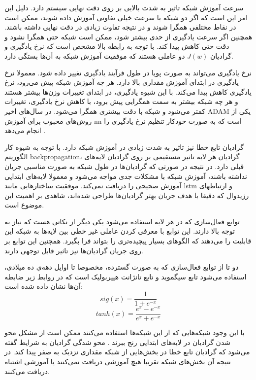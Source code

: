 سرعت آموزش شبکه تاثیر به شدت بالایی بر روی دقت نهایی سیستم دارد. دلیل این امر
این است که اگر دو شبکه با سرعت خیلی تفاوتی آموزش داده شوند، ممکن است در نقاط
مختلفی همگرا شوند و در نتیجه تفاوت زیادی در دقت نهایی داشته باشند. همچنین اگر
سرعت یادگیری از حدی بیشتر شود، ممکن است شبکه حتی همگرا نشود و دقت حتی کاهش پیدا
کند. با توجه به رابطه بالا مشخص است که نرخ یادگیری و گرادیان $J(w)$ دو عاملی
هستند که موفقیت آموزش شبکه به آن‌ها بستگی دارد.

نرخ یادگیری می‌تواند به صورت پویا در طول فرآیند یادگیری تغییر داده شود. معمولا
نرخ یادگیری در ابتدای آموزش مقداری بالا دارد. هر چه آموزش شبکه پیش می‌رود، نرخ
یادگیری کاهش پیدا می‌کند. با این شیوه یادگیری، در ابتدای تغییرات وزن‌ها بیشتر
هستند و هر چه شبکه بیشتر به سمت همگرایی پیش برود، با کاهش نرخ یادگیری، تغییرات
کمتر می‌شود و شبکه با دقت بیشتری همگرا می‌شود. در سال‌های اخیر ADAM یکی از
روش‌های محبوب برای آموزش \gls{nn} است که به صورت خودکار تنظیم نرخ یادگیری را
انجام می‌دهد \cite{kingma2014adam}.

گرادیان تابع خطا نیز تاثیر به شدت زیادی در آموزش شبکه دارد. با توجه به شیوه کار
الگوریتم \gls{backpropagation}، گرادیان هر لایه تاثیر مستقیمی بر روی گرادیان
لایه‌های قبلی دارد. در نتیجه در صورتی که گرادیان‌ها در طول شبکه به صورت مناسبی
جریان نداشته باشند، آموزش شبکه با مشکلات جدی مواجه می‌شود و معمولا لایه‌های
ابتدایی آموزش صحیحی را دریافت نمی‌کند. موفقیت ساختارهایی مانند \gls{lstm} و
ارتباطهای رزیدوال که دقیقا با هدف جریان بهتر گرادیان‌ها طراحی شده‌اند، شاهدی بر
اهمیت این موضوع است.

توابع فعال‌سازی که در هر لایه استفاده می‌شود یکی دیگر از نکاتی هست که نیاز به
توجه بالا دارند. این توابع با معرفی کردن عاملی غیر خطی بین لایه‌ها به شبکه این
قابلیت را می‌دهند که الگوهای بسیار پیچیده‌تری را بتواند فرا بگیرد. همچنین این
توابع بر روی جریان گرادیان‌ها نیز تاثیر قابل توجهی دارند.

دو تا از توابع فعال‌سازی که به صورت گسترده، مخصوصا تا اوایل دهه‌ي ده میلادی،
استفاده می‌شود تابع سیگموید و تابع  تانژانت هیپربولیک است که در روابط زیر ضابطه
آن‌ها نشان داده شده است:
\begin{equation}
    sig(x) = \frac{1}{1 + e^{-x}}
\end{equation}
\begin{equation}
    tanh(x) = \frac{e^x - e^{-x}}{e^x + e^{-x}}
\end{equation}

با این وجود شبکه‌هایی که از این شبکه‌ها استفاده می‌کنند ممکن است از مشکل محو شدن
گرادیان در لایه‌های ابتدایی رنج ببرند \cite{bengio1994learning}. محو شدگی
گرادیان به شرایط گفته می‌شود که گرادیان تابع خطا در بخش‌هایی از شبکه مقداری
نزدیک به صفر پیدا کند. در نتیجه آن بخش‌های شبکه تقریبا هیچ آموزشی دریافت
نمی‌کنند یا آموزشی اشتباه دریافت می‌کنند.


